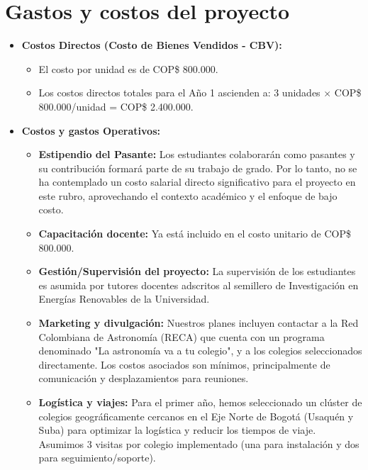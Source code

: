 \section{Gastos y costos del proyecto}

\begin{itemize}
  \item \textbf{Costos Directos (Costo de Bienes Vendidos - CBV):}
    \begin{itemize}
      \item El costo por unidad es de COP\$ 800.000.
      \item Los costos directos totales para el Año 1 ascienden a:
        3 unidades $\times$ COP\$ 800.000/unidad = COP\$ 2.400.000.
    \end{itemize}
  \item \textbf{Costos y gastos Operativos:}
    \begin{itemize}
      \item \textbf{Estipendio del Pasante:} Los estudiantes colaborarán como
        pasantes y su contribución formará parte de su trabajo de grado. Por
        lo tanto, no se ha contemplado un costo salarial directo
        significativo para el proyecto en este rubro, aprovechando el
        contexto académico y el enfoque de bajo costo.
      \item \textbf{Capacitación docente:} Ya está incluido en el costo
        unitario de COP\$ 800.000.
      \item \textbf{Gestión/Supervisión del proyecto:} La supervisión de los
        estudiantes es asumida por tutores docentes adscritos al semillero de
        Investigación en Energías Renovables de la Universidad.
      \item \textbf{Marketing y divulgación:} Nuestros planes incluyen
        contactar a la Red Colombiana de Astronomía (RECA) que cuenta con un
        programa denominado "La astronomía va a tu colegio", y a los colegios
        seleccionados directamente. Los costos asociados son mínimos,
        principalmente de comunicación y desplazamientos para reuniones.
      \item \textbf{Logística y viajes:} Para el primer año, hemos
        seleccionado un clúster de colegios geográficamente cercanos en el
        Eje Norte de Bogotá (Usaquén y Suba) para optimizar la logística y
        reducir los tiempos de viaje. Asumimos 3 visitas por colegio
        implementado (una para instalación y dos para seguimiento/soporte).
        \begin{itemize}

\end{itemize}
\end{itemize}
\end{itemize}
